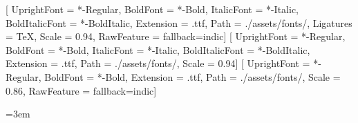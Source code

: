 
\setmainfont{IBMPlexSerif}[
  UprightFont = *-Regular, BoldFont = *-Bold, ItalicFont = *-Italic, BoldItalicFont = *-BoldItalic,
  Extension = .ttf, Path = ./assets/fonts/, Ligatures = TeX, Scale = 0.94, RawFeature = {fallback=indic}]
\setsansfont{WorkSans}[
  UprightFont = *-Regular, BoldFont = *-Bold, ItalicFont = *-Italic, BoldItalicFont = *-BoldItalic,
  Extension = .ttf, Path = ./assets/fonts/, Scale = 0.94]
\setmonofont{IBMPlexMono}[
  UprightFont = *-Regular, BoldFont = *-Bold, Extension = .ttf, Path = ./assets/fonts/, Scale = 0.86,
  RawFeature = {fallback=indic}]

\linespread{1.12}
\setlength{\parindent}{0pt}
\setlength{\parskip}{0.55em plus 0.15em minus 0.05em}
\raggedbottom
\AtBeginDocument{\addtolength{\topskip}{0pt plus 60pt}}  %
\frenchspacing
{}
\emergencystretch=3em

\color{ink}

\usepackage{tikz}
\usetikzlibrary{calc}
\usepackage[most]{tcolorbox}
\usepackage{changepage}
\usepackage{enumitem}
\usepackage{needspace}
\usepackage{booktabs}
\usepackage{fvextra}

